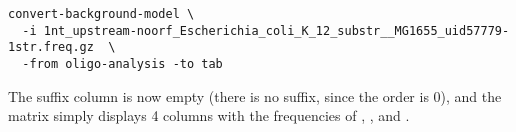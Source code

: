 \begin{small}
\begin{verbatim}
convert-background-model \
  -i 1nt_upstream-noorf_Escherichia_coli_K_12_substr__MG1655_uid57779-1str.freq.gz  \
  -from oligo-analysis -to tab
\end{verbatim}
\end{small}

The suffix column is now empty (there is no suffix, since the order is
0), and the matrix simply displays 4 columns with the frequencies of
\seq{A}, \seq{C}, \seq{G} and \seq{T}.
